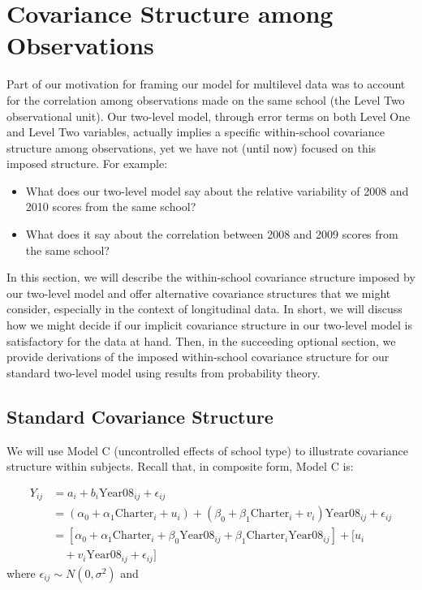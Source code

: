 \documentclass[
]{krantz}
\providecommand{\tightlist}{%
  \setlength{\itemsep}{0pt}\setlength{\parskip}{0pt}}
\begin{document}
\section{Covariance Structure among Observations}\label{errorcovariance}

Part of our motivation for framing our model for multilevel data was to account for the correlation among observations made on the same school (the Level Two observational unit). Our two-level model, through error terms on both Level One and Level Two variables, actually implies a specific within-school covariance structure  among observations, yet we have not (until now) focused on this imposed structure. For example:

\begin{itemize}
\tightlist
\item
  What does our two-level model say about the relative variability of 2008 and 2010 scores from the same school?
\item
  What does it say about the correlation between 2008 and 2009 scores from the same school?
\end{itemize}

In this section, we will describe the within-school covariance structure imposed by our two-level model and offer alternative covariance structures that we might consider, especially in the context of longitudinal data. In short, we will discuss how we might decide if our implicit covariance structure in our two-level model is satisfactory for the data at hand. Then, in the succeeding optional section, we provide derivations of the imposed within-school covariance structure for our standard two-level model using results from probability theory.

\subsection{Standard Covariance Structure}\label{standarderror}

We will use Model C (uncontrolled effects of school type) to illustrate covariance structure within subjects. Recall that, in composite form, Model C is:

\begin{align*}
Y_{ij} & = a_{i}+b_{i}\textrm{Year08}_{ij}+ \epsilon_{ij} \\
       & = (\alpha_{0}+ \alpha_{1}\textrm{Charter}_i + u_{i}) + (\beta_{0}+\beta_{1}\textrm{Charter}_i +v_{i}) \textrm{Year08}_{ij} + \epsilon_{ij} \\
       & = [\alpha_{0}+\alpha_{1}\textrm{Charter}_i + \beta_{0}\textrm{Year08}_{ij} + \beta_{1}\textrm{Charter}_i\textrm{Year08}_{ij}] + [u_{i} \\
       & \quad + v_{i}\textrm{Year08}_{ij} + \epsilon_{ij}]
\end{align*}
\noindent where \(\epsilon_{ij}\sim N(0,\sigma^2)\) and
\end{document}
